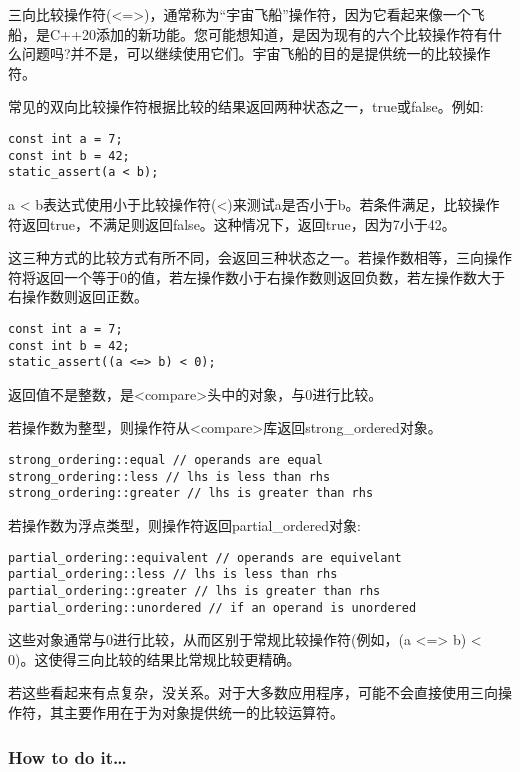 
三向比较操作符(<=>)，通常称为“宇宙飞船”操作符，因为它看起来像一个飞船，是C++20添加的新功能。您可能想知道，是因为现有的六个比较操作符有什么问题吗?并不是，可以继续使用它们。宇宙飞船的目的是提供统一的比较操作符。

常见的双向比较操作符根据比较的结果返回两种状态之一，true或false。例如:

\begin{lstlisting}[style=styleCXX]
const int a = 7;
const int b = 42;
static_assert(a < b);
\end{lstlisting}

a < b表达式使用小于比较操作符(<)来测试a是否小于b。若条件满足，比较操作符返回true，不满足则返回false。这种情况下，返回true，因为7小于42。

这三种方式的比较方式有所不同，会返回三种状态之一。若操作数相等，三向操作符将返回一个等于0的值，若左操作数小于右操作数则返回负数，若左操作数大于右操作数则返回正数。

\begin{lstlisting}[style=styleCXX]
const int a = 7;
const int b = 42;
static_assert((a <=> b) < 0);
\end{lstlisting}

返回值不是整数，是<compare>头中的对象，与0进行比较。

若操作数为整型，则操作符从<compare>库返回strong\_ordered对象。

\begin{lstlisting}[style=styleCXX]
strong_ordering::equal // operands are equal
strong_ordering::less // lhs is less than rhs
strong_ordering::greater // lhs is greater than rhs
\end{lstlisting}

若操作数为浮点类型，则操作符返回partial\_ordered对象:

\begin{lstlisting}[style=styleCXX]
partial_ordering::equivalent // operands are equivelant
partial_ordering::less // lhs is less than rhs
partial_ordering::greater // lhs is greater than rhs
partial_ordering::unordered // if an operand is unordered
\end{lstlisting}

这些对象通常与0进行比较，从而区别于常规比较操作符(例如，(a <=> b) < 0)。这使得三向比较的结果比常规比较更精确。

若这些看起来有点复杂，没关系。对于大多数应用程序，可能不会直接使用三向操作符，其主要作用在于为对象提供统一的比较运算符。

\subsubsection{How to do it…}

